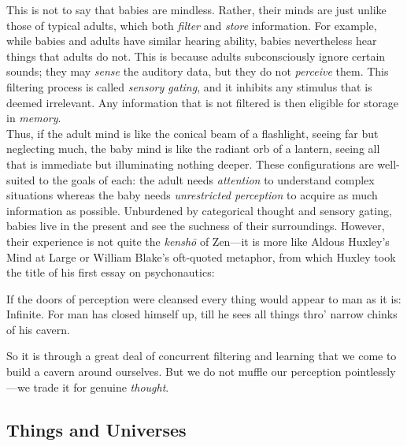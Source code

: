 This is not to say that babies are mindless. Rather, their minds are just unlike those of typical adults, which both \textit{filter} and \textit{store} information. For example, while babies and adults have similar hearing ability, babies nevertheless hear things that adults do not. This is because adults subconsciously ignore certain sounds; they may \textit{sense} the auditory data, but they do not \textit{perceive} them. This filtering process is called \textit{sensory gating}, and it inhibits any stimulus that is deemed irrelevant. Any information that is not filtered is then eligible for storage in \textit{memory}. \\

Thus, if the adult mind is like the conical beam of a flashlight, seeing far but neglecting much, the baby mind is like the radiant orb of a lantern, seeing all that is immediate but illuminating nothing deeper. These configurations are well-suited to the goals of each: the adult needs \textit{attention} to understand complex situations whereas the baby needs \textit{unrestricted perception} to acquire as much information as possible. Unburdened by categorical thought and sensory gating, babies live in the present and see the suchness of their surroundings. However, their experience is not quite the \textit{kensh\=o} of Zen---it is more like Aldous Huxley's Mind at Large or William Blake's oft-quoted metaphor, from which Huxley took the title of his first essay on psychonautics: \\

\begin{displayquote}
	If the doors of perception were cleansed every thing would appear to man as it is: Infinite. For man has closed himself up, till he sees all things thro' narrow chinks of his cavern. \\
\end{displayquote}

So it is through a great deal of concurrent filtering and learning that we come to build a cavern around ourselves. But we do not muffle our perception pointlessly---we trade it for genuine \textit{thought}. \\




\subsection{Things and Universes}

